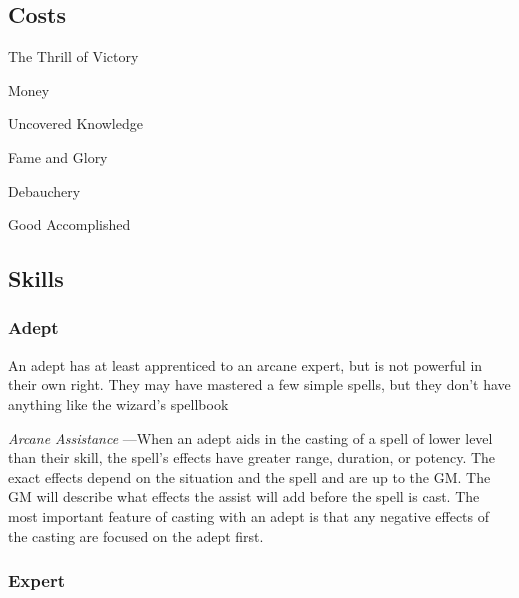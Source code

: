        
\subsection{Costs}   
       
\startitemize[1,packed]
         
\item The Thrill of Victory

         
\item Money

         
\item Uncovered Knowledge

         
\item Fame and Glory

         
\item Debauchery

         
\item Good Accomplished

       
\stopitemize
       
\subsection{Skills}   
       
\subsubsection{Adept}   
       

An adept has at least apprenticed to an arcane expert, but is not powerful in their own right. They may have mastered a few simple spells, but they don't have anything like the wizard's spellbook

       

         {\em Arcane Assistance} —When an adept aids in the casting of a spell of lower level than their skill, the spell's effects have greater range, duration, or potency. The exact effects depend on the situation and the spell and are up to the GM. The GM will describe what effects the assist will add before the spell is cast. The most important feature of casting with an adept is that any negative effects of the casting are focused on the adept first.

       
\subsubsection{Expert}   
       

